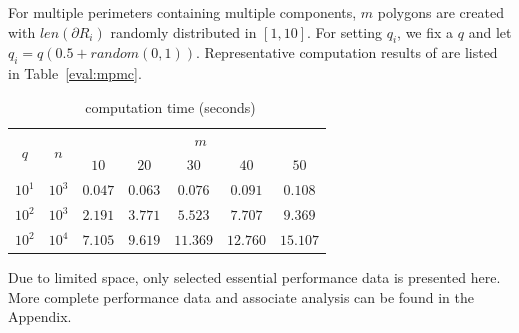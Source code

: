 For multiple perimeters containing multiple components, $m$ polygons 
are created with $len(\partial R_i)$ randomly distributed in $[1, 10]$. 
For setting $q_i$, we fix a $q$ and let $q_i = q(0.5 + random(0, 1))$. 
Representative computation results of \algoMRG are listed in 
Table~\ref{eval:mpmc}.
\begin{table}[ht!]
    \vspace*{-2mm}
    \footnotesize
    \centering
    \begin{tabular}{|c|c|c|c|c|c|c|} 
        \hline
        \multirow{2}{*}{$q$} & \multirow{2}{*}{$n$} & \multicolumn{5}{|c|}{$m$} \\ \cline{3-7}
        \rule{0pt}{2.5ex} & & $10$ & $20$ & $30$ & $40$ & $50$ \\ \hline
        \rule{0pt}{2.5ex} $10^1$ & $10^3$ & $ 0.047$ & $ 0.063$ & $ 0.076$ & $ 0.091$ & $ 0.108$ \\ \hline
        \rule{0pt}{2.5ex} $10^2$ & $10^3$ & $ 2.191$ & $ 3.771$ & $ 5.523$ & $ 7.707$ & $ 9.369$ \\ \hline
        \rule{0pt}{2.5ex} $10^2$ & $10^4$ & $ 7.105$ & $ 9.619$ & $11.369$ & $12.760$ & $15.107$ \\ \hline
    \end{tabular}
    \vspace*{-3mm}
    \caption{\label{eval:opg-mpmc} \algoMRG~computation time (seconds)}
    \vspace*{-4mm}
\end{table}

Due to limited space, only selected essential performance data is 
presented here. More complete performance data and associate analysis 
can be found in the Appendix. 


